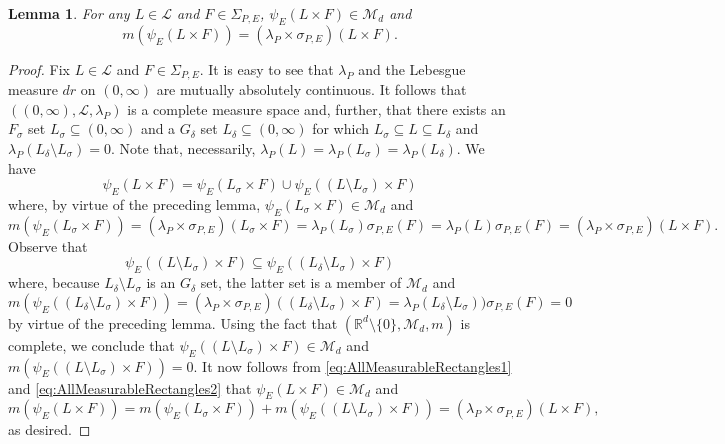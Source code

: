 \documentclass[11pt]{article}
\newtheorem{lemma}[theorem]{Lemma}
\theoremstyle{remark}
\begin{document}
\begin{lemma}\label{lem:AllMeasurableRectangles} For any $L\in\mathcal{L}$ and $F\in \Sigma_{P,E}$, $\psi_E(L\times F)\in\mathcal{M}_d$ and 
\begin{equation*}
m(\psi_E(L\times F))=(\lambda_P\times\sigma_{P,E})(L\times F).
\end{equation*}
\end{lemma}
\begin{proof}
Fix $L\in\mathcal{L}$ and $F\in\Sigma_{P,E}$. It is easy to see that $\lambda_P$ and the Lebesgue measure $dr$ on $(0,\infty)$ are mutually absolutely continuous. It follows that $((0,\infty), \mathcal{L},\lambda_P)$ is a complete measure space and, further, that there exists an $F_\sigma$ set $L_\sigma\subseteq (0,\infty)$ and a $G_\delta$ set $L_\delta\subseteq (0,\infty)$ for which $L_\sigma\subseteq L\subseteq L_\delta$ and $\lambda_P(L_\delta\setminus L_\sigma)=0$. Note that, necessarily, $\lambda_P(L)=\lambda_P(L_\sigma)=\lambda_P(L_\delta)$. We have
\begin{equation}\label{eq:AllMeasurableRectangles1}
\psi_E(L\times F)=\psi_E( L_\sigma\times F)\cup\psi_E((L\setminus L_\sigma)\times F)
\end{equation}
where, by virtue of the preceding lemma, $\psi_E(L_\sigma\times F)\in \mathcal{M}_d$ and
\begin{equation}\label{eq:AllMeasurableRectangles2}
m(\psi_E(L_{\sigma}\times F))=(\lambda_P\times\sigma_{P,E})( L_\sigma\times F)=\lambda_P(L_\sigma)\sigma_{P,E}(F)=\lambda_P(L)\sigma_{P,E}(F)=(\lambda_P\times\sigma_{P,E})(L\times F).
\end{equation}
Observe that
\begin{equation*}
\psi_E((L\setminus L_\sigma)\times F)\subseteq \psi_E((L_{\delta}\setminus L_\sigma)\times F)
\end{equation*}
where, because $L_\delta\setminus L_\sigma$ is an $G_{\delta}$ set, the latter set is a member of $\mathcal{M}_d$ and
\begin{equation*}
m(\psi_E((L_\delta\setminus L_\sigma)\times F))=(\lambda_P\times\sigma_{P,E})((L_\delta\setminus L_\sigma)\times F)=\lambda_P(L_\delta\setminus L_\sigma))\sigma_{P,E}(F)=0
\end{equation*}
by virtue of the preceding lemma. Using the fact that $(\mathbb{R}^d\setminus\{0\},\mathcal{M}_d,m)$ is complete, we conclude that $\psi_E((L\setminus L_\sigma)\times F)\in \mathcal{M}_d$ and $m(\psi_E((L\setminus L_\sigma)\times F))=0$. It now follows from \eqref{eq:AllMeasurableRectangles1} and \eqref{eq:AllMeasurableRectangles2} that $\psi_E(L\times F)\in\mathcal{M}_d$ and
\begin{equation*}
m(\psi_E(L\times F))=m(\psi_E(L_\sigma\times F))+m(\psi_E((L\setminus L_\sigma)\times F))=(\lambda_P\times\sigma_{P,E})(L\times F),
\end{equation*}
as desired.
\end{proof}
\end{document}
